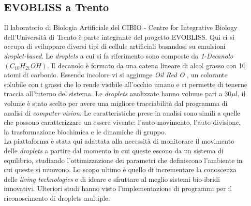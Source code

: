 \subsection{EVOBLISS a Trento}
\label{sec:trento}
Il laboratorio di Biologia Artificiale del CIBIO - Centre for Integrative Biology dell'Università di Trento è parte integrante del progetto EVOBLISS.
Qui ci si occupa di sviluppare diversi tipi di cellule artificiali basandosi su emulsioni \emph{droplet-based}. 
Le \emph{droplets} a cui si fa riferimento sono composte da \emph{1-Decanolo} $(C_{10}H_{21}OH)$. Il decanolo è formato da una catena lineare di alcol grasso con 10 atomi di carbonio.\cite{decanolo} Essendo incolore vi si aggiunge \emph{Oil Red O} \cite{oilredo}, un colorante solubile con i grassi che lo rende visibile all'occhio umano e ci permette di tenerne traccia all'interno del sistema. Le \emph{droplets} analizzate hanno volume pari a $30\mu l$, il volume è stato scelto per avere una migliore  tracciabilità dal programma di analisi di \emph{computer vision}.
Le caratteristiche prese in analisi sono simili a quelle che possono caratterizzare un essere vivente: l'auto-movimento, l'auto-divisione, la trasformazione biochimica e le dinamiche di gruppo.
\\La piattaforma è stata qui adattata alla necessità di monitorare il movimento delle \emph{droplets} a partire dal momento in cui queste escono da un sistema di equilibrio, studiando l'ottimizzazione dei parametri che definiscono l'ambiente in cui queste si muovono. Lo scopo ultimo è quello di incrementare la conoscenza delle \emph{living technologies} e di ideare e sfruttare al meglio sistemi bio-ibridi innovativi.
Ulteriori studi hanno visto l'implementazione di programmi per il riconoscimento di droplets multiple. 
 















